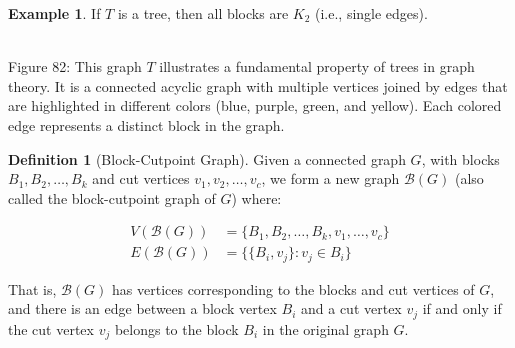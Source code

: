 \documentclass{article}
\theoremstyle{definition}
\newtheorem{example}{Example}
\newtheorem{definition}{Definition}
\begin{document}
\begin{example}
If $T$ is a tree, then all blocks are $K_2$ (i.e., single edges).

\begin{center}
\\
\small Figure 82: This graph $T$ illustrates a fundamental property of trees in graph theory. It is a connected acyclic graph with multiple vertices joined by edges that are highlighted in different colors (blue, purple, green, and yellow). Each colored edge represents a distinct block in the graph.

\end{center}
\end{example}

\begin{definition}[Block-Cutpoint Graph]
Given a connected graph $G$, with blocks $B_1, B_2, \ldots, B_k$ and cut vertices $v_1, v_2, \ldots, v_c$, we form a new graph $\mathcal{B}(G)$ (also called the block-cutpoint graph of $G$) where:

\begin{align}
V(\mathcal{B}(G)) &= \{B_1, B_2, \ldots, B_k, v_1, \ldots, v_c\} \\
E(\mathcal{B}(G)) &= \{\{B_i, v_j\} : v_j \in B_i\}
\end{align}


That is, $\mathcal{B}(G)$ has vertices corresponding to the blocks and cut vertices of $G$, and there is an edge between a block vertex $B_i$ and a cut vertex $v_j$ if and only if the cut vertex $v_j$ belongs to the block $B_i$ in the original graph $G$.
\end{definition}
\end{document}
